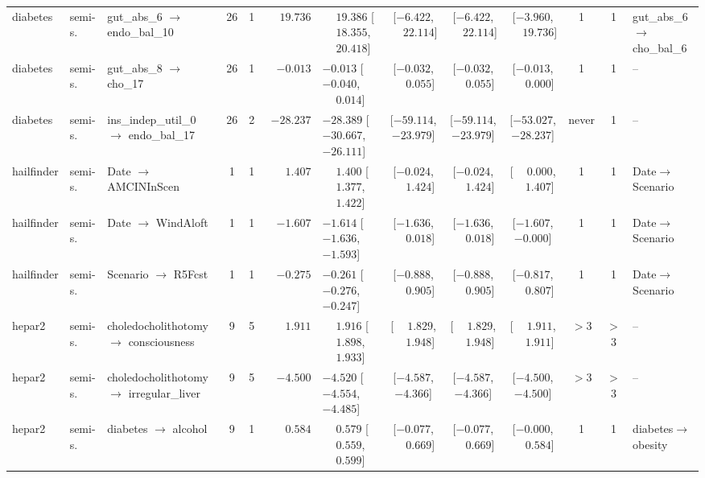 \begin{landscape}
\begin{longtable}{@{}llp{2.15cm}ccrl cccc c l@{}}
diabetes & semi-s. & gut\_\allowbreak{}abs\_\allowbreak{}6 $\to$ endo\_\allowbreak{}bal\_\allowbreak{}10 & 26 & 1 & $\phantom{-}19.736$ & $\phantom{-}19.386$ [$\phantom{-}18.355$, $\phantom{-}20.418$] & [$-6.422$, $\phantom{-}22.114$] & [$-6.422$, $\phantom{-}22.114$] & [$-3.960$, $\phantom{-}19.736$] & 1 & 1 & gut\_abs\_6$\to$cho\_bal\_6 \\
diabetes & semi-s. & gut\_\allowbreak{}abs\_\allowbreak{}8 $\to$ cho\_\allowbreak{}17 & 26 & 1 & $-0.013$ & $-0.013$ [$-0.040$, $\phantom{-}0.014$] & [$-0.032$, $\phantom{-}0.055$] & [$-0.032$, $\phantom{-}0.055$] & [$-0.013$, $\phantom{-}0.000$] & 1 & 1 & -- \\
diabetes & semi-s. & ins\_\allowbreak{}indep\_\allowbreak{}util\_\allowbreak{}0 $\to$ endo\_\allowbreak{}bal\_\allowbreak{}17 & 26 & 2 & $-28.237$ & $-28.389$ [$-30.667$, $-26.111$] & [$-59.114$, $-23.979$] & [$-59.114$, $-23.979$] & [$-53.027$, $-28.237$] & never & 1 & -- \\
hailfinder & semi-s. & Date $\to$ AMCINIn\allowbreak{}Scen & 1 & 1 & $\phantom{-}1.407$ & $\phantom{-}1.400$ [$\phantom{-}1.377$, $\phantom{-}1.422$] & [$-0.024$, $\phantom{-}1.424$] & [$-0.024$, $\phantom{-}1.424$] & [$\phantom{-}0.000$, $\phantom{-}1.407$] & 1 & 1 & Date$\to$Scenario \\
hailfinder & semi-s. & Date $\to$ Wind\allowbreak{}Aloft & 1 & 1 & $-1.607$ & $-1.614$ [$-1.636$, $-1.593$] & [$-1.636$, $\phantom{-}0.018$] & [$-1.636$, $\phantom{-}0.018$] & [$-1.607$, $-0.000$] & 1 & 1 & Date$\to$Scenario \\
hailfinder & semi-s. & Scenario $\to$ R5Fcst & 1 & 1 & $-0.275$ & $-0.261$ [$-0.276$, $-0.247$] & [$-0.888$, $\phantom{-}0.905$] & [$-0.888$, $\phantom{-}0.905$] & [$-0.817$, $\phantom{-}0.807$] & 1 & 1 & Date$\to$Scenario \\
hepar2 & semi-s. & choledocholithotomy $\to$ consciousness & 9 & 5 & $\phantom{-}1.911$ & $\phantom{-}1.916$ [$\phantom{-}1.898$, $\phantom{-}1.933$] & [$\phantom{-}1.829$, $\phantom{-}1.948$] & [$\phantom{-}1.829$, $\phantom{-}1.948$] & [$\phantom{-}1.911$, $\phantom{-}1.911$] & $>$3 & $>$3 & -- \\
hepar2 & semi-s. & choledocholithotomy $\to$ irregular\_\allowbreak{}liver & 9 & 5 & $-4.500$ & $-4.520$ [$-4.554$, $-4.485$] & [$-4.587$, $-4.366$] & [$-4.587$, $-4.366$] & [$-4.500$, $-4.500$] & $>$3 & $>$3 & -- \\
hepar2 & semi-s. & diabetes $\to$ alcohol & 9 & 1 & $\phantom{-}0.584$ & $\phantom{-}0.579$ [$\phantom{-}0.559$, $\phantom{-}0.599$] & [$-0.077$, $\phantom{-}0.669$] & [$-0.077$, $\phantom{-}0.669$] & [$-0.000$, $\phantom{-}0.584$] & 1 & 1 & diabetes$\to$obesity \\

\end{longtable}
\end{landscape}
